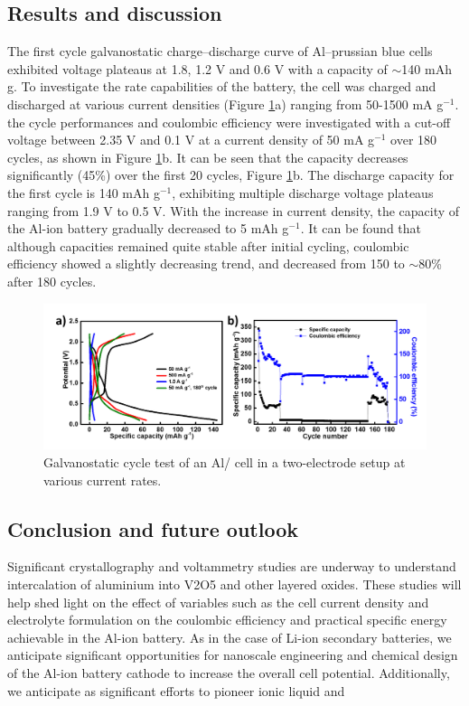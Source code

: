 \subsection{Results and discussion}
The first cycle galvanostatic charge–discharge curve of Al–prussian blue cells exhibited voltage plateaus at 1.8, 1.2 V and 0.6 V with a capacity of $\sim$140 mAh g. To investigate the rate capabilities of the battery, the cell was charged and discharged at various current densities (Figure \ref{Figures/chap6fig:pbCDC2}a) ranging from 50-1500 mA g$^{-1}$. the cycle performances and coulombic efficiency were investigated with a cut-off voltage between 2.35 V and 0.1 V at a current density of 50 mA g$^{-1}$ over 180 cycles, as shown in Figure \ref{Figures/chap6fig:pbCDC2}b. It can be seen that the capacity decreases significantly (45\%) over the first 20 cycles, Figure \ref{Figures/chap6fig:pbCDC2}b. The discharge capacity for the first cycle is 140 mAh g$^{-1}$, exhibiting multiple discharge voltage plateaus ranging from 1.9 V to 0.5 V. With the increase in current density, the capacity of the Al-ion battery gradually decreased to 5 mAh g$^{-1}$. It can be found that although capacities remained quite stable after initial cycling, coulombic efficiency showed a slightly decreasing trend, and decreased from 150 to $\sim$80\% after 180 cycles. 

 \begin{figure}[tbh!]
  \centering
  \includegraphics[width=\textwidth]{Figures/chap6fig/pbCDC2}
    \caption{Galvanostatic cycle test of an Al/ cell in a two-electrode setup at various current rates.}
  \label{Figures/chap6fig:pbCDC2}
\end{figure}

\subsection{Conclusion and future outlook}
Significant crystallography and voltammetry studies are underway to understand intercalation of aluminium into V2O5 and other layered oxides. These studies will help
shed light on the effect of variables such as the cell current
density and electrolyte formulation on the coulombic efficiency
and practical specific energy achievable in the Al-ion battery. As in the case of Li-ion secondary batteries, we anticipate significant opportunities for nanoscale engineering and chemical design of the Al-ion battery cathode to increase the overall cell potential. Additionally, we anticipate as significant efforts to pioneer ionic liquid and
